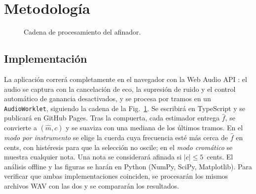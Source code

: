 \documentclass[conference,a4paper]{IEEEtran}
\newcommand{\fo}{f_0}
\begin{document}
\section{Metodología}
\begin{figure}[t]
\centering
{}
\caption{Cadena de procesamiento del afinador.}
\label{fig:cadena}
\end{figure}

\subsection{Implementación}
La aplicación correrá completamente en el navegador con la Web Audio API \parencite{w3c2021webaudio}: el audio se captura con la cancelación de eco, la supresión de ruido y el control automático de ganancia desactivados, y se procesa por tramos en un \texttt{AudioWorklet}, siguiendo la cadena de la Fig.~\ref{fig:cadena}. Se escribirá en TypeScript y se publicará en GitHub Pages. Tras la compuerta, cada estimador entrega $\hat f$, se convierte a $(\hat m, c)$ y se suaviza con una mediana de los últimos tramos. En el \emph{modo por instrumento} se elige la cuerda cuya frecuencia esté más cerca de $\hat f$ en cents, con histéresis para que la selección no oscile; en el \emph{modo cromático} se muestra cualquier nota. Una nota se considerará afinada si $|c|\le 5$~cents. El análisis offline y las figuras se harán en Python (NumPy, SciPy, Matplotlib). Para verificar que ambas implementaciones coinciden, se procesarán los mismos archivos WAV con las dos y se compararán los resultados.
\end{document}
